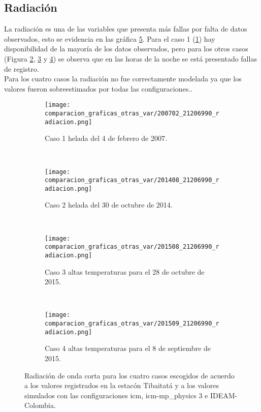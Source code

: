 \subsection{Radiación}


La radiación es una de las variables que presenta más fallas por falta de datos observados, esto se evidencia en las gráfica \ref{fig:wrf_rad_tibaitata}. Para el caso 1 (\ref{caso1_tiba_wrf_rad}) hay disponibilidad de la mayoría de los datos observados, pero para los otros casos (Figura \ref{caso2_tiba_wrf_rad}, \ref{caso3_tiba_wrf_rad} y \ref{caso4_tiba_wrf_rad}) se observa que en las horas de la noche se está presentado fallas de registro.\\

Para los cuatro casos la radiación no fue correctamente modelada ya que los valores fueron sobreestimados por todas las configuraciones..\\

\begin{figure}[H]
    
\begin{subfigure}[normla]{0.4\textwidth}
\caption{Caso 1 helada del 4 de febrero de 2007.}
\label{caso1_tiba_wrf_rad}
\texttt{[image: comparacion\_graficas\_otras\_var/200702\_21206990\_radiacion.png]}
\end{subfigure}
~
\begin{subfigure}[normla]{0.4\textwidth}
\caption{Caso 2 helada del 30 de octubre de 2014.}
\label{caso2_tiba_wrf_rad}
\texttt{[image: comparacion\_graficas\_otras\_var/201408\_21206990\_radiacion.png]}
\end{subfigure}
~
\centering
\begin{subfigure}[normla]{0.4\textwidth}
\caption{Caso 3 altas temperaturas para el 28 de octubre de 2015.}
\label{caso3_tiba_wrf_rad}
\texttt{[image: comparacion\_graficas\_otras\_var/201508\_21206990\_radiacion.png]}
\end{subfigure}
~
\centering
\begin{subfigure}[normla]{0.4\textwidth}
\caption{Caso 4 altas temperaturas para el 8 de septiembre de 2015.}
\label{caso4_tiba_wrf_rad}
\texttt{[image: comparacion\_graficas\_otras\_var/201509\_21206990\_radiacion.png]}
\end{subfigure}

    \caption{Radiación de onda corta para los cuatro casos escogidos de acuerdo a los valores registrados en la estacón Tibaitatá y a los valores simulados con las configuraciones icm, icm-mp\_physics 3 e IDEAM-Colombia.} %
    \label{fig:wrf_rad_tibaitata}
\end{figure}


